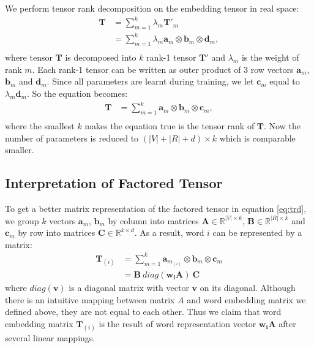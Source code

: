 \documentclass[a4paper]{article}
\begin{document}
We perform tensor rank decomposition \citep{hitchcock1927expression} on the embedding tensor in real space:
\begin{equation} \label{eq:trd-org}
\begin{aligned}
    \mathbf{T}   
        &= \sum_{m=1}^{k} \lambda_m \mathbf{T}'_m \\
        &= \sum_{m=1}^{k} \lambda_m \mathbf{a}_m \otimes \mathbf{b}_m \otimes \mathbf{d}_m, \\
\end{aligned}
\end{equation}
where tensor $\mathbf{T}$ is decomposed into $k$ rank-1 tensor $\mathbf{T}'$ and $\lambda_m$ is the weight of rank $m$. Each rank-1 tensor can be written as outer product of 3 row vectors $\mathbf{a}_m$, $\mathbf{b}_m$ and $\mathbf{d}_m$. Since all parameters are learnt during training, we let $\mathbf{c}_m$ equal to $\lambda_m \mathbf{d}_m$. So the equation becomes:
\begin{equation} \label{eq:trd}
\begin{aligned}
    \mathbf{T}   
        &= \sum_{m=1}^{k} \mathbf{a}_m \otimes \mathbf{b}_m \otimes \mathbf{c}_m, \\
\end{aligned}
\end{equation}
where the smallest $k$ makes the equation true is the tensor rank of $\mathbf{T}$. Now the number of parameters is reduced to $(|V| + |R| + d) \times k$ which is comparable smaller. 

\subsection{Interpretation of Factored Tensor} \label{sec:tf-expl}
To get a better matrix representation of the factored tensor in equation \eqref{eq:trd}, we group $k$ vectors $\mathbf{a}_m$, $\mathbf{b}_m$ by column into matrices $\mathbf{A} \in \mathbb{R}^{|V| \times k}$, $\mathbf{B} \in \mathbb{R}^{|R| \times k}$ and $\mathbf{c}_m$ by row into matrices $\mathbf{C} \in \mathbb{R}^{k \times d}$. As a result, word $i$ can be represented by a matrix: 
\begin{equation} \label{eq:we-tensor}
\begin{aligned}
    \mathbf{T}_{(i)}
        &= \sum_{m=1}^{k} \mathbf{a}_{m_{(i)}} \otimes \mathbf{b}_{m} \otimes \mathbf{c}_m \\
        &= \mathbf{B} \ diag(\mathbf{w_i}\mathbf{A}) \ \mathbf{C}
\end{aligned}
\end{equation}
where $diag(\mathbf{v})$ is a diagonal matrix with vector $\mathbf{v}$ on its diagonal. Although there is an intuitive mapping between matrix $A$ and word embedding matrix we defined above, they are not equal to each other. Thus we claim that word embedding matrix $\mathbf{T}_{(i)}$ is the result of word representation vector $\mathbf{w_i}\mathbf{A}$ after several linear mappings. 
\end{document}
